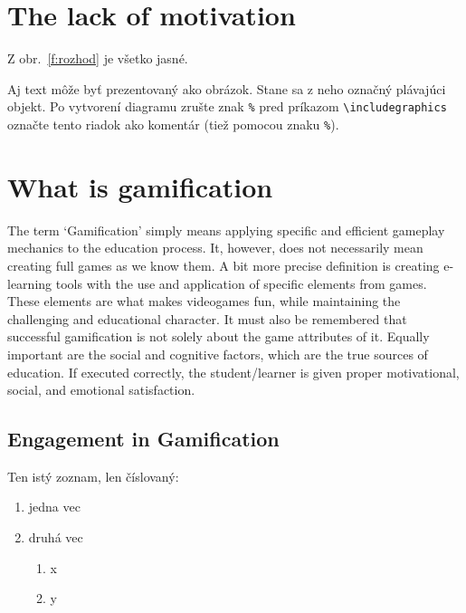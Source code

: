 \documentclass[10pt,twoside,english,a4paper]{article}
\begin{document}
\section{The lack of motivation} \label{section2}

Z obr.~\ref{f:rozhod} je všetko jasné. 

\begin{figure*}[tbh]
\centering
Aj text môže byť prezentovaný ako obrázok. Stane sa z neho označný plávajúci objekt. Po vytvorení diagramu zrušte znak \texttt{\%} pred príkazom \verb|\includegraphics| označte tento riadok ako komentár (tiež pomocou znaku \texttt{\%}).
\caption{Rozhodujúci argument.}
\label{f:rozhod}
\end{figure*}



\section{What is gamification} \label{section3}
The term ‘Gamification’ simply means applying specific and efficient gameplay mechanics to the education process. It, however, does not necessarily mean creating full games as we know them.\cite{Raymer}
A bit more precise definition is creating e-learning tools with the use and application of specific elements from games. These elements are what makes videogames fun, while maintaining the challenging and educational character.\cite{Abu-Dawood} 
It must also be remembered that successful gamification is not solely about the game attributes of it. Equally important are the social and cognitive factors, which are the true sources of education. \cite{Raymer}
If executed correctly, the student/learner is given proper motivational, social, and emotional satisfaction.\cite{Abu-Dawood} 
\subsection{Engagement in Gamification} \label{section3:1}



Ten istý zoznam, len číslovaný:

\begin{enumerate}
\item jedna vec
\item druhá vec
	\begin{enumerate}
	\item x
	\item y
	\end{enumerate}
\end{enumerate}
\end{document}

